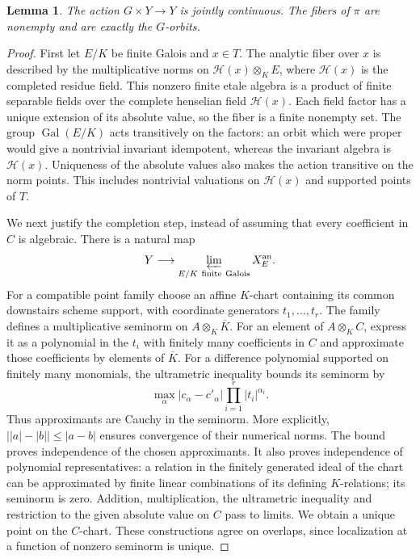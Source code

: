 \documentclass[11pt]{article}
\newtheorem{lemma}[theorem]{Lemma}
\theoremstyle{remark}
\newcommand{\an}{\mathrm{an}}
\newcommand{\Gal}{\operatorname{Gal}}
\begin{document}
\begin{lemma}\label{lem:quotient}
The action $G\times Y\to Y$ is jointly continuous. The fibers of
$\pi$ are nonempty and are exactly the $G$-orbits.
\end{lemma}
\begin{proof}
First let $E/K$ be finite Galois and $x\in T$. The analytic fiber over
$x$ is described by the multiplicative norms on
$\mathcal H(x)\otimes_K E$, where $\mathcal H(x)$ is the completed
residue field. This nonzero finite etale algebra is a product of finite
separable fields over the complete henselian field $\mathcal H(x)$.
Each field factor has a unique extension of its absolute value, so
the fiber is a finite nonempty set. The group $\Gal(E/K)$ acts
transitively on the factors: an orbit which were proper would give a
nontrivial invariant idempotent, whereas the invariant algebra is
$\mathcal H(x)$. Uniqueness of the absolute values also makes the
action transitive on the norm points. This includes nontrivial
valuations on $\mathcal H(x)$ and supported points of $T$.

We next justify the completion step, instead of assuming that every
coefficient in $C$ is algebraic. There is a natural map
\begin{equation}\label{eq:inverse}
 Y\longrightarrow\varprojlim_{E/K\ \mathrm{finite\ Galois}}X_E^{\an}.
\end{equation}
For a compatible point family choose an affine $K$-chart containing
its common downstairs scheme support, with coordinate generators
$t_1,\ldots,t_r$. The family defines a multiplicative seminorm on
$A\otimes_K\overline K$. For an element of $A\otimes_K C$, express
it as a polynomial in the $t_i$ with finitely many coefficients in
$C$ and approximate those coefficients by elements of $\overline K$.
For a difference polynomial supported on finitely many monomials,
the ultrametric inequality bounds its seminorm by
\[
 \max_\alpha |c_\alpha-c'_\alpha|
                   \prod_{i=1}^r|t_i|^{\alpha_i}.
\]
Thus approximants are Cauchy in the seminorm. More explicitly,
$\big||a|-|b|\big|\leq|a-b|$ ensures convergence of their numerical
norms. The bound proves independence of the chosen approximants.
It also proves independence of polynomial representatives: a relation
in the finitely generated ideal of the chart can be approximated by
finite linear combinations of its defining $K$-relations; its
seminorm is zero. Addition, multiplication, the ultrametric inequality
and restriction to the given absolute value on $C$ pass to limits.
We obtain a unique point on the $C$-chart. These constructions agree
on overlaps, since localization at a function of nonzero seminorm is
unique.


\end{proof}
\end{document}
